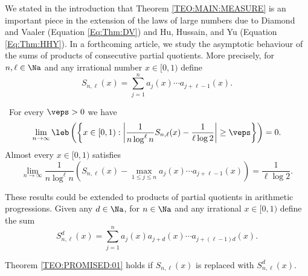\documentclass[12pt,a4paper]{amsart}
\begin{document}
We stated in the introduction that Theorem \ref{TEO:MAIN:MEASURE} is an important piece in the extension of the laws of large numbers due to Diamond and Vaaler (Equation \eqref{Eq:Thm:DV}) and Hu, Hussain, and Yu (Equation \eqref{Eq:Thm:HHY}). In a forthcoming article, we study the asymptotic behaviour of the sums of products of consecutive partial quotients. More precisely, for $n,\ell\in\Na$ and any irrational number $x\in [0,1)$ define
\[
S_{n,\ell}(x)=\sum_{j=1}^n a_{j}(x) \cdots a_{j+\ell-1}(x).
\]
\begin{teo01}\label{TEO:PROMISED:01}\
For every $\veps>0$ we have
\[
\lim_{n\to \infty}
\leb
\left(\left\{ 
x\in [0,1): 
\left| \frac{1}{n\log^{\ell}n} S_{n,\ell}(x) - \frac{1}{\ell \log 2}\right|\geq \veps\right\}\right)=0.
\]
Almost every $x\in [0,1)$ satisfies
\[
\lim_{n\to\infty} 
\frac{1}{n\log^{\ell} n} 
\left( S_{n,\ell}(x) - \max_{1\leq j \leq n} a_{j}(x)\cdots a_{j+\ell-1}(x)\right)
=
\frac{1}{\ell \log 2}.
\]
\end{teo01}

These results could be extended to products of partial quotients in arithmetic progressions. Given any $d\in\Na$,  for $n\in\Na$  and any irrational $x\in [0,1)$ define the sum 
\[
S_{n,\ell}^d(x)
=
\sum_{j=1}^n a_{j}(x)a_{j+d}(x) \cdots a_{j+(\ell-1)d}(x).
\]
\begin{propo01}
Theorem \ref{TEO:PROMISED:01} holds if $S_{n,\ell}(x)$ is replaced with $S_{n,\ell}^d(x)$.
\end{propo01}
\end{document}
